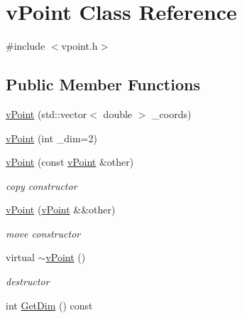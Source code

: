 \hypertarget{classv_point}{}\section{v\+Point Class Reference}
\label{classv_point}


{\ttfamily \#include $<$vpoint.\+h$>$}

\subsection*{Public Member Functions}
\begin{DoxyCompactItemize}
\item 
\hyperlink{classv_point_ab3ac707d0f2109ade8ee78a20b076e0d}{v\+Point} (std\+::vector$<$ double $>$ \+\_\+coords)
\item 
\hyperlink{classv_point_ab08b85daf7ffc356d9241cd3f62acec9}{v\+Point} (int \+\_\+dim=2)
\item 
\mbox{\label{classv_point_aea28f9a9e8148227ef6c7e6d8066f71f}} 
\hyperlink{classv_point_aea28f9a9e8148227ef6c7e6d8066f71f}{v\+Point} (const \hyperlink{classv_point}{v\+Point} \&other)
\begin{DoxyCompactList}\small\item\em copy constructor \end{DoxyCompactList}\item 
\mbox{\label{classv_point_a9417173a073a0438a0edc8b742351c68}} 
\hyperlink{classv_point_a9417173a073a0438a0edc8b742351c68}{v\+Point} (\hyperlink{classv_point}{v\+Point} \&\&other)
\begin{DoxyCompactList}\small\item\em move constructor \end{DoxyCompactList}\item 
\mbox{\label{classv_point_a6ba561bfb51c682ec29c88fb25fa70eb}} 
virtual \hyperlink{classv_point_a6ba561bfb51c682ec29c88fb25fa70eb}{$\sim$v\+Point} ()
\begin{DoxyCompactList}\small\item\em destructor \end{DoxyCompactList}\item 
\mbox{\label{classv_point_a9e1f704bf5ededf6933c79a927a723b4}} 
int \hyperlink{classv_point_a9e1f704bf5ededf6933c79a927a723b4}{Get\+Dim} () const

\end{DoxyCompactItemize}
